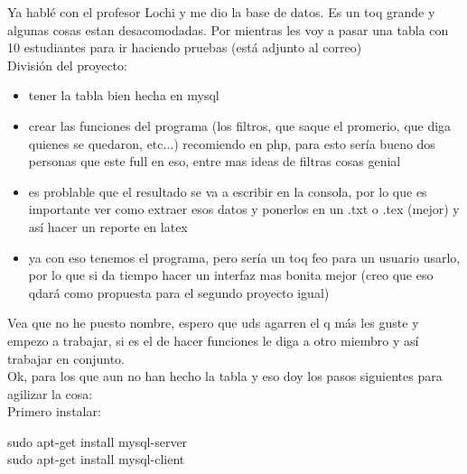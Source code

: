 \documentclass[11pt]{article} %
\begin{document}
Ya hablé con el profesor Lochi y me dio la base de datos. Es un toq grande y algunas cosas estan desacomodadas. Por mientras les voy a pasar una tabla con 10 estudiantes para ir haciendo pruebas (está adjunto al correo)\\

División del proyecto:
\begin{itemize}
\item tener la tabla bien hecha en mysql
\item crear las funciones del programa (los filtros, que saque el promerio, que diga quienes se quedaron, etc...) recomiendo en php, para esto sería bueno dos personas que este full en eso, entre mas ideas de filtras cosas genial
\item es problable que el resultado se va a escribir en la consola, por lo que es importante ver como extraer esos datos y ponerlos en un .txt o .tex (mejor) y así hacer un reporte en latex
\item ya con eso tenemos el programa, pero sería un toq feo para un usuario usarlo, por lo que si da tiempo hacer un interfaz mas bonita mejor (creo que eso qdará como propuesta para el segundo proyecto igual)
\end{itemize}
Vea que no he puesto nombre, espero que uds agarren el q más les guste y empezo a trabajar, si es el de hacer funciones le diga a otro miembro y así trabajar en conjunto.\\

Ok, para los que aun no han hecho la tabla y eso doy los pasos siguientes para agilizar la cosa:\\

Primero instalar:
 
\begin{shaded}
sudo apt-get install mysql-server\\
sudo apt-get install mysql-client
\end{shaded}
\end{document}
